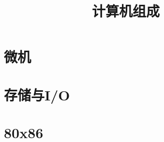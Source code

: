 \documentclass[10pt,a4paper]{article}
\begin{document}
	\begin{CJK}{UTF8}{song}
	\title{计算机组成}
	\date{}
	\begin{multicols}{3}
		\maketitle
		\section{微机}
		
		\section{存储与I/O}
		
		\section{80x86}
		

\end{multicols}
\end{CJK}
\end{document}
